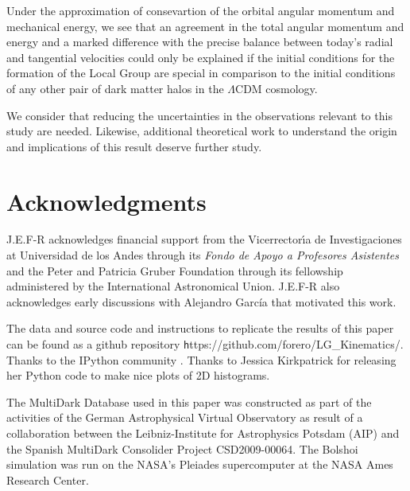 \documentclass{emulateapj}
\begin{document}
Under the approximation of consevartion of the orbital angular momentum and mechanical energy, we see that an agreement in the total angular momentum and energy and a marked difference with the precise balance between today's radial and tangential velocities could only be explained if the initial conditions for the formation of the Local Group are special in comparison to the initial conditions of any other pair of dark matter halos in the $\Lambda$CDM cosmology. 

We consider that reducing the uncertainties in the observations relevant to this study are needed. Likewise, additional theoretical work to understand the origin and implications of this result deserve further study.

\label{sec:conclusions}
\section*{Acknowledgments}  
J.E.F-R acknowledges financial support from the Vicerrector\'{\i}a de Investigaciones at Universidad de los Andes through its {\it Fondo de Apoyo a Profesores Asistentes} and the Peter and Patricia Gruber Foundation through its fellowship administered by the International Astronomical Union. J.E.F-R also acknowledges early discussions with Alejandro Garc\'ia that motivated this work.

The data and source code and instructions to replicate the results of this paper can be found as a github repository {\texttt https://github.com/forero/LG\_Kinematics/}. Thanks to the IPython community \citep{IPython}. Thanks to Jessica Kirkpatrick for releasing her Python code to make nice plots of 2D histograms. 

The MultiDark Database used in this paper 
was %
constructed as part of the activities of the German Astrophysical Virtual Observatory as result of a collaboration between the Leibniz-Institute for Astrophysics Potsdam (AIP) and the Spanish MultiDark Consolider Project CSD2009-00064. The Bolshoi simulation was run on the NASA's Pleiades supercomputer at the NASA Ames Research Center.



 
\end{document}
